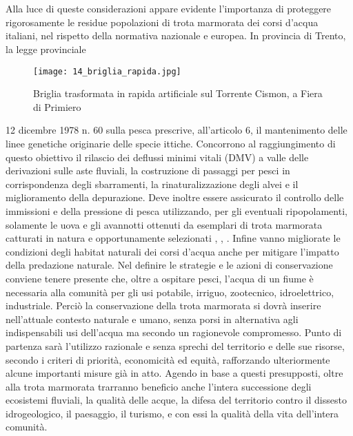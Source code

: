 \documentclass[10pt,twoside,openany,x11names,svgnames,italian,a5paper,dvipsnames,table]{memoir}
\begin{document}
\section*{}
Alla luce di queste considerazioni appare evidente l'importanza di proteggere rigorosamente le residue popolazioni di trota marmorata dei corsi d'acqua italiani, nel rispetto della normativa nazionale e europea. In provincia di Trento, la legge provinciale \begin{wrapfigure}[14]{r}{.6\textwidth}
\vspace{-0.7cm}
\begin{center}
\texttt{[image: 14\_briglia\_rapida.jpg]}
\caption*{Briglia trasformata in rapida artificiale sul Torrente Cismon, a Fiera di Primiero}
\end{center}
\end{wrapfigure}12 dicembre 1978 n. 60 sulla pesca prescrive, all’articolo 6, il mantenimento delle linee genetiche originarie delle specie ittiche. Concorrono al raggiungimento di questo obiettivo il rilascio dei deflussi minimi vitali (DMV) a valle delle derivazioni sulle aste fluviali, la costruzione di passaggi per pesci in corrispondenza degli sbarramenti, la rinaturalizzazione degli alvei e il miglioramento della depurazione.
Deve inoltre essere assicurato il controllo delle immissioni e della pressione di pesca utilizzando, per gli eventuali ripopolamenti, solamente le uova e gli avannotti ottenuti da esemplari di trota marmorata catturati in natura e opportunamente selezionati \cite{Vittori81}, \cite{AAVV03}, \cite{Pontalti08}. Infine vanno migliorate le condizioni degli habitat naturali dei corsi d'acqua anche per mitigare l'impatto della predazione naturale.
Nel definire le strategie e le azioni di conservazione conviene tenere presente che, oltre a ospitare pesci, l’acqua di un fiume è necessaria alla comunità per gli usi potabile, irriguo, zootecnico, idroelettrico, industriale. Perciò la conservazione della trota marmorata si dovrà inserire nell’attuale contesto naturale e umano, senza porsi in alternativa agli indispensabili usi dell’acqua ma secondo un ragionevole compromesso. Punto di partenza sarà l’utilizzo razionale e senza sprechi del territorio e delle sue risorse, secondo i criteri di priorità, economicità ed equità, rafforzando ulteriormente alcune importanti misure già in atto. Agendo in base a questi presupposti, oltre alla trota marmorata trarranno beneficio anche l’intera successione degli ecosistemi fluviali, la qualità delle acque, la difesa del territorio contro il dissesto idrogeologico, il paesaggio, il turismo, e con essi la qualità della vita dell'intera comunità. 
\end{document}
